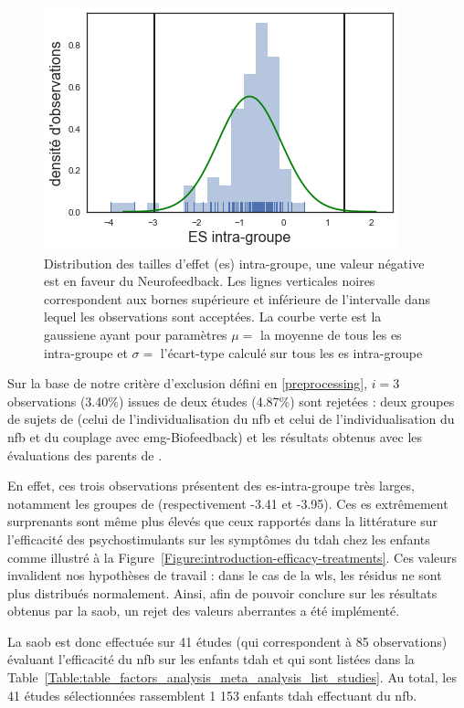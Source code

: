 \begin{figure}[h!]
  \centering
	\includegraphics[width=0.7\linewidth]{figures/chapter-3/distribution-ES-within} 
  \caption{Distribution des tailles d'effet (\gls{es}) intra-groupe, une valeur négative est en faveur du Neurofeedback. Les lignes 
	verticales noires correspondent aux bornes supérieure et 
	inférieure de l'intervalle dans lequel les observations sont acceptées. La courbe verte est la gaussiene ayant pour paramètres $\mu =$ la moyenne
	de tous les \gls{es} intra-groupe et $\sigma =$ l'écart-type calculé sur tous les \gls{es} intra-groupe}
  \label{Figure:distribution_ES_within}
\end{figure}

Sur la base de notre critère d'exclusion défini en \ref{preprocessing}, $i = 3$ observations (3.40\%) issues de deux études (4.87\%) sont rejetées : deux groupes de sujets de 
\citet{Bazanova2018} (celui de l'individualisation du \gls{nfb} et 
celui de l'individualisation du \gls{nfb} et du couplage avec \gls{emg}-Biofeedback) et les résultats obtenus avec les évaluations des 
parents de \citet{Rajabi2019}. 

En effet, ces trois observations présentent des \gls{es}-intra-groupe très larges, notamment les groupes de \citet{Bazanova2018} 
(respectivement -3.41 et -3.95). Ces \gls{es} extrêmement surprenants sont même plus élevés que ceux rapportés dans la littérature sur l'efficacité 
des psychostimulants sur les symptômes du \gls{tdah} chez les enfants \citep{Luan2017} comme illustré à la Figure~\ref{Figure:introduction-efficacy-treatments}. 
Ces valeurs invalident nos hypothèses de travail : dans le cas de la 
\gls{wls}, les résidus ne sont plus distribués normalement. Ainsi, afin de pouvoir conclure sur les résultats obtenus par la \gls{saob}, 
un rejet des valeurs aberrantes a été implémenté.

La \gls{saob} est donc effectuée sur 41 études (qui correspondent à 85 observations) évaluant l'efficacité du \gls{nfb} sur les enfants \gls{tdah} et 
qui sont listées dans la Table~\ref{Table:table_factors_analysis_meta_analysis_list_studies}. Au total, les 41 études sélectionnées rassemblent 
1 153 enfants \gls{tdah} effectuant du \gls{nfb}.

